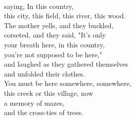 \documentclass[smalldemyvopaper,11pt,twoside,onecolumn,openright,extrafontsizes]{memoir}
\begin{document}
\\saying, In this country,
\\this city, this field, this river, this wood.
\\The mother yells, and they buckled,
\\corseted, and they said, "It's only
\\your breath here, in this country,
\\you're not supposed to be here,"
\\and laughed as they gathered themselves
\\and unfolded their clothes.
\\You must be here somewhere, somewhere,
\\this creek or this village, now
\\a memory of mazes,
\\and the cross-ties of trees.
\end{document}
